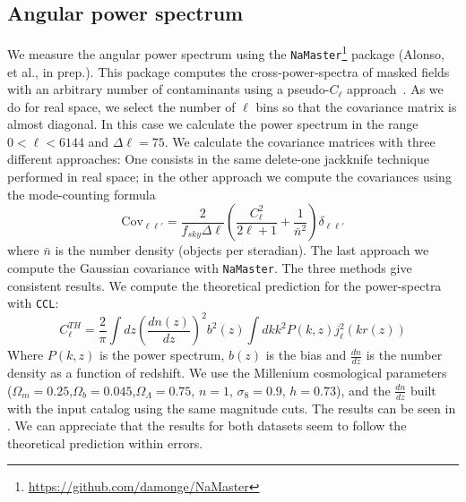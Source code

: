 \documentclass[\docopts]{\docclass}
\begin{document}
\subsection{Angular power spectrum}
We measure the angular power spectrum using the \texttt{NaMaster}\footnote{\url{https://github.com/damonge/NaMaster}} package (Alonso, et al., in prep.). This package computes the cross-power-spectra of masked fields with an arbitrary number of contaminants using a pseudo-$C_{\ell}$ approach~\citep{2002ApJ...567....2H,2017MNRAS.465.1847E}. As we do for real space, we select the number of $\ell$ bins so that the covariance matrix is almost diagonal. In this case we calculate the power spectrum in the range $0 < \ell < 6144$ and $\Delta \ell = 75$. We calculate the covariance matrices with three different approaches: One consists in the same delete-one jackknife technique performed in real space; in the other approach we compute the covariances using the mode-counting formula~\citep{Dodelson:1282338,2007MNRAS.381.1347C}
\begin{equation}
\mathrm{Cov}_{\ell\ell'}=\frac{2}{f_{sky}\Delta\ell}\left(\frac{C_{\ell}^{2}}{2\ell+1}+\frac{1}{\bar{n}^{2}}\right)\delta_{\ell\ell'}
\end{equation}
where $\bar{n}$ is the number density (objects per steradian). The last approach we compute the Gaussian covariance with \texttt{NaMaster}. The three methods give consistent results. We compute the theoretical prediction for the power-spectra with \texttt{CCL}:
\begin{equation}
C_{\ell}^{TH} = \frac{2}{\pi}\int{dz} \left(\frac{dn(z)}{dz}\right)^{2} b^{2}(z) \int{dk k^{2} P(k,z)j^{2}_{\ell}(kr(z))}
\end{equation}
Where $P(k,z)$ is the power spectrum, $b(z)$ is the bias and $\frac{dn}{dz}$ is the number density as a function of redshift. We use the Millenium cosmological parameters~\citep{2005Nature.435.629S} ($\Omega_{m}=0.25$,$\Omega_{b}=0.045$,$\Omega_{\Lambda}=0.75$, $n=1$, $\sigma_{8}=0.9$, $h=0.73$), and the $\frac{dn}{dz}$ built with the input catalog using the same magnitude cuts. The results can be seen in . We can appreciate that the results for both datasets seem to follow the theoretical prediction within errors.
\end{document}
